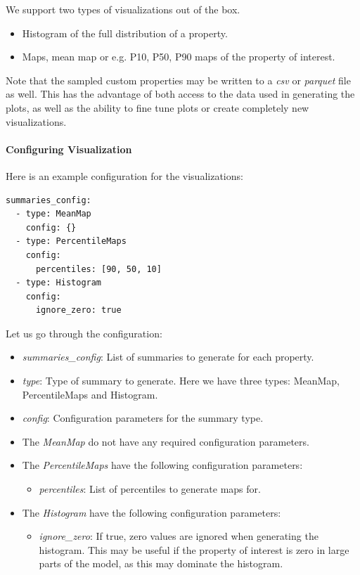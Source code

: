 \documentclass[note,screen,english,12pt,utf8]{nrdoc}
\begin{document}
We support two types of visualizations out of the box.

\begin{itemize}
    \item Histogram of the full distribution of a property.
    \item Maps, mean map or e.g. P10, P50, P90 maps of the property of interest.
\end{itemize}

Note that the sampled custom properties may be written to a \emph{csv}
or \emph{parquet} file as well. This has the advantage of both access to the
data used in generating the plots, as well as the ability to
fine tune plots or create completely new visualizations.

\paragraph{Configuring Visualization}

Here is an example configuration for the visualizations:
\begin{verbatim}
summaries_config:
  - type: MeanMap
    config: {}
  - type: PercentileMaps
    config:
      percentiles: [90, 50, 10]
  - type: Histogram
    config:
      ignore_zero: true
\end{verbatim}


Let us go through the configuration:
\begin{itemize}
    \item{
        \emph{summaries\_config}: List of summaries to generate for each property.
    }
    \item{
        \emph{type}: Type of summary to generate. Here we have three types:
        MeanMap, PercentileMaps and Histogram.
    }
    \item{
        \emph{config}: Configuration parameters for the summary type.
    }
    \item{
        The \emph{MeanMap} do not have any required configuration parameters.
    }
    \item{
        The \emph{PercentileMaps} have the following configuration parameters:
        \begin{itemize}
            \item \emph{percentiles}: List of percentiles to generate maps for.
        \end{itemize}
    }
    \item{
        The \emph{Histogram} have the following configuration parameters:
        \begin{itemize}
            \item \emph{ignore\_zero}: If true, zero values are ignored when generating the histogram.
              This may be useful if the property of interest is zero in large parts of the model,
              as this may dominate the histogram.
        \end{itemize}
    }
\end{itemize}
\end{document}
